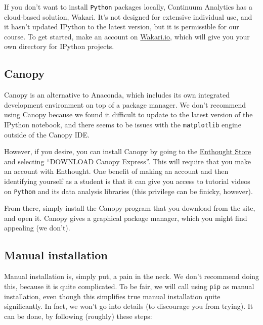 \documentclass{article}
\begin{document}
If you don't want to install \texttt{Python} packages locally, Continuum
Analytics has a cloud-based solution, Wakari. It's not designed for
extensive individual use, and it hasn't updated IPython to the latest
version, but it is permissible for our course. To get started, make an
account on \href{https://wakari.io/}{Wakari.io}, which will give you
your own directory for IPython projects.

    \subsection{Canopy}\label{canopy}

Canopy is an alternative to Anaconda, which includes its own integrated
development environment on top of a package manager. We don't recommend
using Canopy because we found it difficult to update to the latest
version of the IPython notebook, and there seems to be issues with the
\texttt{matplotlib} engine outside of the Canopy IDE.

However, if you desire, you can install Canopy by going to the
\href{https://store.enthought.com/downloads/}{Enthought Store} and
selecting ``DOWNLOAD Canopy Express''. This will require that you make
an account with Enthought. One benefit of making an account and then
identifying yourself as a student is that it can give you access to
tutorial videos on \texttt{Python} and its data analysis libraries (this
privilege can be finicky, however).

From there, simply install the Canopy program that you download from the
site, and open it. Canopy gives a graphical package manager, which you
might find appealing (we don't).

    \subsection{Manual installation}\label{manual-installation}

Manual installation is, simply put, a pain in the neck. We don't
recommend doing this, because it is quite complicated. To be fair, we
will call using \texttt{pip} as manual installation, even though this
simplifies true manual installation quite significantly. In fact, we
won't go into details (to discourage you from trying). It can be done,
by following (roughly) these steps:
\end{document}
